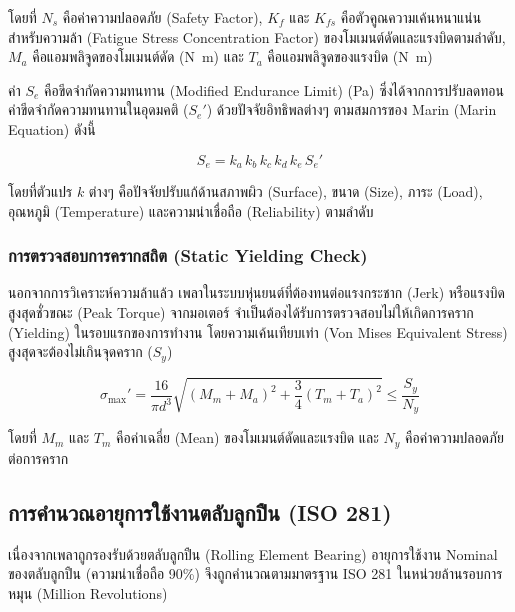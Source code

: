 \noindent โดยที่ $N_s$ คือค่าความปลอดภัย (Safety Factor), $K_f$ และ $K_{fs}$ คือตัวคูณความเค้นหนาแน่นสำหรับความล้า (Fatigue Stress Concentration Factor) ของโมเมนต์ดัดและแรงบิดตามลำดับ, $M_a$ คือแอมพลิจูดของโมเมนต์ดัด (\si{\newton\metre}) และ $T_a$ คือแอมพลิจูดของแรงบิด (\si{\newton\metre})

ค่า $S_e$ คือขีดจำกัดความทนทาน (Modified Endurance Limit) (\si{\pascal}) ซึ่งได้จากการปรับลดทอนค่าขีดจำกัดความทนทานในอุดมคติ ($S_e'$) ด้วยปัจจัยอิทธิพลต่างๆ ตามสมการของ Marin (Marin Equation) ดังนี้

\begin{equation}
    S_e = k_a\, k_b\, k_c\, k_d\, k_e\, S_e'
    \label{eq:marin_factors}
\end{equation}

\noindent โดยที่ตัวแปร $k$ ต่างๆ คือปัจจัยปรับแก้ด้านสภาพผิว (Surface), ขนาด (Size), ภาระ (Load), อุณหภูมิ (Temperature) และความน่าเชื่อถือ (Reliability) ตามลำดับ

\subsubsection{การตรวจสอบการครากสถิต (Static Yielding Check)}

นอกจากการวิเคราะห์ความล้าแล้ว เพลาในระบบหุ่นยนต์ที่ต้องทนต่อแรงกระชาก (Jerk) หรือแรงบิดสูงสุดชั่วขณะ (Peak Torque) จากมอเตอร์ จำเป็นต้องได้รับการตรวจสอบไม่ให้เกิดการคราก (Yielding) ในรอบแรกของการทำงาน โดยความเค้นเทียบเท่า (Von Mises Equivalent Stress) สูงสุดจะต้องไม่เกินจุดคราก ($S_y$)

\begin{equation}
    \sigma_{\max}' = \frac{16}{\pi d^3} \sqrt{\left(M_m + M_a\right)^2 + \frac{3}{4}\left(T_m + T_a\right)^2} \leq \frac{S_y}{N_y}
    \label{eq:shaft_yielding}
\end{equation}

\noindent โดยที่ $M_m$ และ $T_m$ คือค่าเฉลี่ย (Mean) ของโมเมนต์ดัดและแรงบิด และ $N_y$ คือค่าความปลอดภัยต่อการคราก

\subsection{การคำนวณอายุการใช้งานตลับลูกปืน (ISO 281)}
\label{subsec:bearing_life}

เนื่องจากเพลาถูกรองรับด้วยตลับลูกปืน (Rolling Element Bearing) อายุการใช้งาน Nominal ของตลับลูกปืน (ความน่าเชื่อถือ 90\%) จึงถูกคำนวณตามมาตรฐาน ISO 281 ในหน่วยล้านรอบการหมุน (Million Revolutions)

